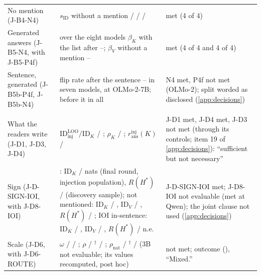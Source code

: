 \begin{table}[p]
\begin{tabular}{@{}p{}p{}p{}@{}}
No mention (J-B4-N4) & $s_{\mathrm{ID}}$ without a mention \JbSidNoneLlamaEight{} / \JbSidNoneGemmaNine{} / \JbSidNonePhiFour{} / \JbSidNoneFalconSeven{} & met (4 of 4) \\
Generated answers (J-B5-N4, with J-B5-P4f) & over the eight models $\beta_K$ with the list after \JbRangeBetaKAfterEightMin{}--\JbRangeBetaKAfterEightMax{}; $\beta_V$ without a mention \JbRangeBetaVNoneEightMin{}--\JbRangeBetaVNoneEightMax{} & met (4 of 4 and 4 of 4) \\
Sentence, generated (J-B5b-P4f, J-B5b-N4) & flip rate after the sentence \JbFivebFlipPostMetMin{}--\JbFivebFlipPostMetMax{} in seven models, \JbFivebFlipPostOlmoSeven{} at OLMo-2-7B; before it \JbRangeFlipPreEightMax{} in all & N4 met, P4f not met (OLMo-2); split worded as disclosed (\cref{app:decisions}) \\
\addlinespace[2pt]
\multicolumn{3}{@{}l}{\textit{Mechanism}} \\
What the readers write (J-D1, J-D3, J-D4) & $\mathrm{ID}_{\mathrm{inj}}^{\mathrm{LOO}}/\mathrm{ID}_K$ \JdOneRatioQwenSeven{} / \JdOneRatioMistralSeven{}; $\rho_K$ \JdThreeRhoFlagQwenSeven{} / \JdThreeRhoFlagMistralSeven{}; $r_{\mathrm{ans}}^{\mathrm{inj}}(K)$ \JdFourKQwenSeven{} / \JdFourKMistralSeven{} & J-D1 met, J-D4 met, J-D3 not met (through its controls; item 19 of \cref{app:decisions}): ``sufficient but not necessary'' \\
Sign (J-D-SIGN-IOI, with J-D8-IOI) & \fmtOpt{}: $\mathrm{ID}_K$ \JdOneIDKQwenSeven{} / \JdOneIDKMistralSeven{} nats (final round, injection population), $R(H^*)$ \HoneRQwenSeven{} / \HoneRMistralSeven{} (discovery sample); not mentioned: $\mathrm{ID}_K$ \JdSevenQoutQwenSeven{} / \JdSevenQoutMistralSeven{}, $\mathrm{ID}_V$ \JdSignQIDVQwenSeven{} / \JdSignQIDVMistralSeven{}, $R(H^*)$ \JdEightQoutRQwenSeven{} / \JdEightQoutRMistralSeven{}; IOI in-sentence: $\mathrm{ID}_K$ \JdSignIoiIDKQwenSeven{} / \JdSignIoiIDKMistralSeven{}, $\mathrm{ID}_V$ \JdSignIoiIDVQwenSeven{} / \JdSignIoiIDVMistralSeven{}, $R(H^*)$ \JdEightIoiRQwenSeven{} / n.e. & J-D-SIGN-IOI met; J-D8-IOI not evaluable (met at Qwen); the joint clause not used (\cref{app:decisions}) \\
Scale (J-D6, with J-D6-ROUTE) & $\omega$ \JdSixaOmegaQwenOnefive{} / \JdSixaOmegaQwenThree{} / \JdSixaOmegaQwenSeven{}; $\rho$ \JdSixRhoQwenOnefive{} / \JdSixRhoQwenThree{}$^\dagger$ / \JdSixRhoQwenSeven{}; $\rho_{\mathrm{nat}}$ \JdSixRhoNatQwenOnefive{} / \JdSixRhoNatQwenThree{}$^\dagger$ / \JdSixRhoNatQwenSeven{} (3B not evaluable; its values recomputed, post hoc) & not met; outcome (\JdSixTable{}), ``Mixed.'' \\

\end{tabular}
\end{table}
